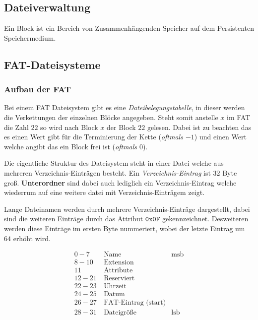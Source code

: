 \documentclass[10pt,a4paper]{article}
\begin{document}
\begin{multicols*}{4}
\section{Dateiverwaltung}

Ein Block ist ein Bereich von Zusammenhängenden Speicher auf dem Persistenten Speichermedium.

\subsection{FAT-Dateisysteme}

\subsubsection*{Aufbau der FAT}
Bei einem FAT Dateisystem gibt es eine \emph{Dateibelegungstabelle}, in dieser werden die Verkettungen der einzelnen
Blöcke angegeben. Steht somit anstelle \(x\) im FAT die Zahl \(22\) so wird nach Block \(x\) der Block \(22\) gelesen.
Dabei ist zu beachten das es einen Wert gibt für die Terminierung der Kette (\textit{oftmals \(\mathit{-1}\)}) und einen
Wert welche angibt das ein Block frei ist (\textit{oftmals \(\mathit{0}\)}).

Die eigentliche Struktur des Dateisystem steht in einer Datei welche aus mehreren Verzeichnis-Einträgen besteht. Ein
\textit{Verzeichnis-Eintrag} ist \(32\) Byte groß. \textbf{Unterordner} sind dabei auch lediglich ein
Verzeichnis-Eintrag welche wiederrum auf eine weitere datei mit Verzeichnis-Einträgem zeigt.

Lange Dateinamen werden durch mehrere Verzeichnis-Einträge dargestellt, dabei sind die weiteren Einträge durch das
Attribut \(\mathtt{0x0F}\) gekennzeichnet. Desweiteren werden diese Einträge im ersten Byte nummeriert, wobei der letzte
Eintrag um \(64\) erhöht wird.

\vspace{-7mm}
\begin{align*}
	0-7   & ~ \text{Name}                & \text{msb} \\
	8-10  & ~ \text{Extension}           &            \\
	11    & ~ \text{Attribute}           &            \\
	12-21 & ~ \text{Reserviert}          &            \\
	22-23 & ~ \text{Uhrzeit}             &            \\
	24-25 & ~ \text{Datum}               &            \\
	26-27 & ~ \text{FAT-Eintrag (start)} &            \\
	28-31 & ~ \text{Dateigröße}          & \text{lsb}
\end{align*}


\end{multicols*}
\end{document}
